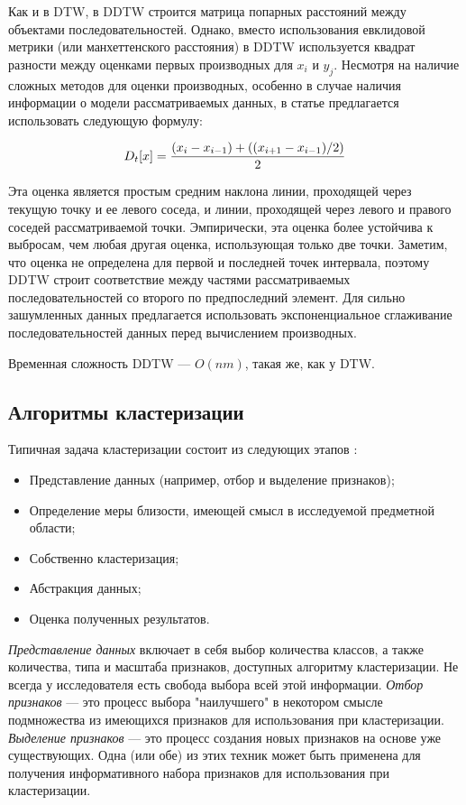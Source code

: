 \documentclass[a4paper, 14pt]{extarticle}
\numberwithin{figure}{subsection}
\numberwithin{equation}{subsection}
\begin{document}
Как и в DTW, в DDTW строится матрица попарных расстояний между объектами последовательностей. Однако, вместо использования евклидовой метрики (или манхеттенского расстояния) в DDTW используется квадрат разности между оценками первых производных для $x_i$ и $y_j$. Несмотря на наличие сложных методов для оценки производных, особенно в случае наличия информации о модели рассматриваемых данных, в статье \cite{kp01} предлагается использовать следующую формулу:

\begin{equation}
	D_t[x]= {{(x_i-x_{i-1})+((x_{i+1}-x_{i-1})/2)} \over {2}}
\end{equation}

Эта оценка является простым средним наклона линии, проходящей через текущую точку и ее левого соседа, и линии, проходящей через левого и правого соседей рассматриваемой точки. Эмпирически, эта оценка более устойчива к выбросам, чем любая другая оценка, использующая только две точки. Заметим, что оценка не определена для первой и последней точек интервала, поэтому DDTW строит соответствие между частями рассматриваемых последовательностей со второго по предпоследний элемент. Для сильно зашумленных данных предлагается \cite{m91} использовать экспоненциальное сглаживание последовательностей данных перед вычислением производных.

Временная сложность DDTW --- $O(nm)$, такая же, как у DTW.

\subsection{Алгоритмы кластеризации}
Типичная задача кластеризации состоит из следующих этапов \cite{jain1988algorithms}:
\begin{itemize}
\item Представление данных (например, отбор и выделение признаков);
\item Определение меры близости, имеющей смысл в исследуемой предметной области;
\item Собственно кластеризация;
\item Абстракция данных;
\item Оценка полученных результатов.
\end{itemize}

{\it Представление данных} включает в себя выбор количества классов, а также количества, типа и масштаба признаков, доступных алгоритму кластеризации. Не всегда у исследователя есть свобода выбора всей этой информации. {\it Отбор признаков} --- это процесс выбора "наилучшего" в некотором смысле подмножества из имеющихся признаков для использования при кластеризации. {\it Выделение признаков} --- это процесс создания новых признаков на основе уже существующих. Одна (или обе) из этих техник может быть применена для получения информативного набора признаков для использования при кластеризации.
\end{document}
